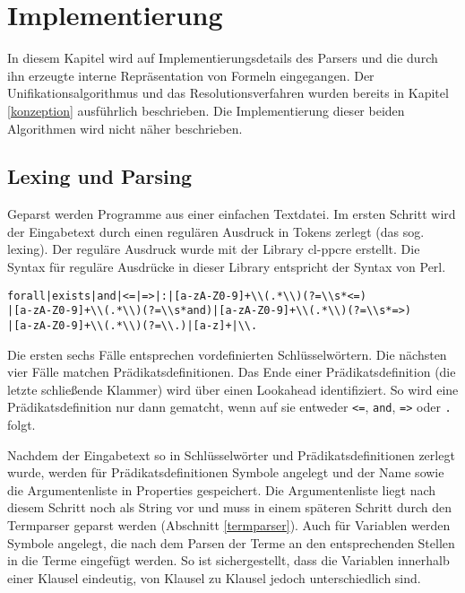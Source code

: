 \chapter{Implementierung}\label{implementierung}

In diesem Kapitel wird auf Implementierungsdetails des Parsers und die durch ihn erzeugte interne Repräsentation von Formeln eingegangen. Der Unifikationsalgorithmus und das Resolutionsverfahren wurden bereits in Kapitel \ref{konzeption} ausführlich beschrieben. Die Implementierung dieser beiden Algorithmen wird nicht näher beschrieben.

\section{Lexing und Parsing}
Geparst werden Programme aus einer einfachen Textdatei. Im ersten Schritt wird der Eingabetext durch einen regulären Ausdruck in Tokens zerlegt (das sog. lexing). Der reguläre Ausdruck wurde mit der Library cl-ppcre \cite{cl-ppcre} erstellt. Die Syntax für reguläre Ausdrücke in dieser Library entspricht der Syntax von Perl.

\begin{verbatim}
forall|exists|and|<=|=>|:|[a-zA-Z0-9]+\\(.*\\)(?=\\s*<=)
|[a-zA-Z0-9]+\\(.*\\)(?=\\s*and)|[a-zA-Z0-9]+\\(.*\\)(?=\\s*=>)
|[a-zA-Z0-9]+\\(.*\\)(?=\\.)|[a-z]+|\\.
\end{verbatim}

Die ersten sechs Fälle entsprechen vordefinierten Schlüsselwörtern. Die nächsten vier Fälle matchen Prädikatsdefinitionen. Das Ende einer Prädikatsdefinition (die letzte schließende Klammer) wird über einen Lookahead identifiziert. So wird eine Prädikatsdefinition nur dann gematcht, wenn auf sie entweder {\tt <=}, {\tt and}, {\tt =>} oder {\tt .} folgt.

Nachdem der Eingabetext so in Schlüsselwörter und Prädikatsdefinitionen zerlegt wurde, werden für Prädikatsdefinitionen Symbole angelegt und der Name sowie die Argumentenliste in Properties gespeichert. Die Argumentenliste liegt nach diesem Schritt noch als String vor und muss in einem späteren Schritt durch den Termparser geparst werden (Abschnitt \ref{termparser}). Auch für Variablen werden Symbole angelegt, die nach dem Parsen der Terme an den entsprechenden Stellen in die Terme eingefügt werden. So ist sichergestellt, dass die Variablen innerhalb einer Klausel eindeutig, von Klausel zu Klausel jedoch unterschiedlich sind.

